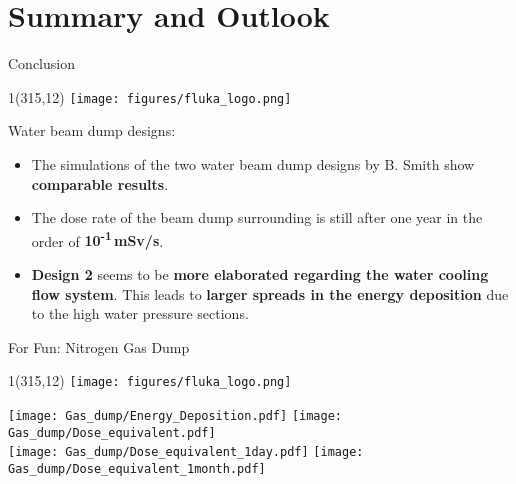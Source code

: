 \documentclass[xcolor={dvipsnames}]{beamer}
\newcommand{\flukalogo}{
  \setlength{\TPHorizModule}{1pt}
  \setlength{\TPVertModule}{1pt}
  \begin{textblock}{1}(315,12)
   \texttt{[image: figures/fluka\_logo.png]}
  \end{textblock}
}
\begin{document}
\section{Summary and Outlook}
\begin{frame}{Conclusion}
 \flukalogo
 Water beam dump designs:
 \begin{itemize}
  \item The simulations of the two water beam dump designs by B. Smith show \textbf{comparable results}.
  \item The dose rate of the beam dump surrounding is still after one year in the order of \textbf{10\textsuperscript{-1}\,mSv/s}.
  \item \textbf{Design 2} seems to be \textbf{more elaborated regarding the water cooling flow system}.
  This leads to \textbf{larger spreads in the energy deposition} due to the high water pressure sections.
 \end{itemize}
\end{frame}
\begin{frame}{For Fun: Nitrogen Gas Dump}
 \flukalogo
 \texttt{[image: Gas\_dump/Energy\_Deposition.pdf]}\hfill
 \texttt{[image: Gas\_dump/Dose\_equivalent.pdf]}\\
 \texttt{[image: Gas\_dump/Dose\_equivalent\_1day.pdf]}\hfill
 \texttt{[image: Gas\_dump/Dose\_equivalent\_1month.pdf]}
\end{frame}
\end{document}
